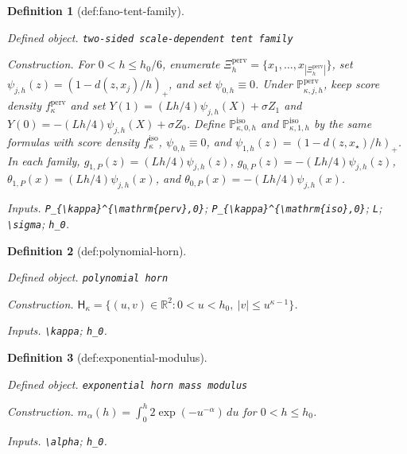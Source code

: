 \documentclass{article}
\newtheorem{definition}{Definition}
\begin{document}
\begin{definition}[def:fano-tent-family]\label{def:fano-tent-family}
\par\smallskip\noindent\emph{Defined object.} \texttt{two-\allowbreak{}sided scale-\allowbreak{}dependent tent family}
\par\smallskip\noindent\emph{Construction.} For \(0<h\le h_0/6\), enumerate \(\Xi_h^{\mathrm{perv}}=\{x_1,\ldots,x_{|\Xi_h^{\mathrm{perv}}|}\}\), set \(\psi_{j,h}(z)=(1-d(z,x_j)/h)_+\), and set \(\psi_{0,h}\equiv0\). Under \(\mathbb P_{\kappa,j,h}^{\mathrm{perv}}\), keep score density \(f_{\kappa}^{\mathrm{perv}}\) and set \(Y(1)=(Lh/4)\psi_{j,h}(X)+\sigma Z_1\) and \(Y(0)=-(Lh/4)\psi_{j,h}(X)+\sigma Z_0\). Define \(\mathbb P_{\kappa,0,h}^{\mathrm{iso}}\) and \(\mathbb P_{\kappa,1,h}^{\mathrm{iso}}\) by the same formulas with score density \(f_{\kappa}^{\mathrm{iso}}\), \(\psi_{0,h}\equiv0\), and \(\psi_{1,h}(z)=(1-d(z,x_{\star})/h)_+\). In each family, \(g_{1,P}(z)=(Lh/4)\psi_{j,h}(z)\), \(g_{0,P}(z)=-(Lh/4)\psi_{j,h}(z)\), \(\theta_{1,P}(x)=(Lh/4)\psi_{j,h}(x)\), and \(\theta_{0,P}(x)=-(Lh/4)\psi_{j,h}(x)\).
\par\smallskip\noindent\emph{Inputs.} \texttt{P\_\allowbreak{}\{\textbackslash{}\allowbreak{}kappa\}\allowbreak{}\textasciicircum{}\{\textbackslash{}\allowbreak{}mathrm\{perv\}\allowbreak{},\allowbreak{}0\}\allowbreak{}}; \texttt{P\_\allowbreak{}\{\textbackslash{}\allowbreak{}kappa\}\allowbreak{}\textasciicircum{}\{\textbackslash{}\allowbreak{}mathrm\{iso\}\allowbreak{},\allowbreak{}0\}\allowbreak{}}; \texttt{L}; \texttt{\textbackslash{}\allowbreak{}sigma}; \texttt{h\_\allowbreak{}0}.
\end{definition}

\begin{definition}[def:polynomial-horn]\label{def:polynomial-horn}
\par\smallskip\noindent\emph{Defined object.} \texttt{polynomial horn}
\par\smallskip\noindent\emph{Construction.} \(\mathsf H_{\kappa}=\{(u,v)\in\mathbb R^2:0<u<h_0,\ |v|\le u^{\kappa-1}\}\).
\par\smallskip\noindent\emph{Inputs.} \texttt{\textbackslash{}\allowbreak{}kappa}; \texttt{h\_\allowbreak{}0}.
\end{definition}

\begin{definition}[def:exponential-modulus]\label{def:exponential-modulus}
\par\smallskip\noindent\emph{Defined object.} \texttt{exponential horn mass modulus}
\par\smallskip\noindent\emph{Construction.} \(m_{\alpha}(h)=\int_0^h2\exp(-u^{-\alpha})\,du\) for \(0<h\le h_0\).
\par\smallskip\noindent\emph{Inputs.} \texttt{\textbackslash{}\allowbreak{}alpha}; \texttt{h\_\allowbreak{}0}.
\end{definition}
\end{document}
